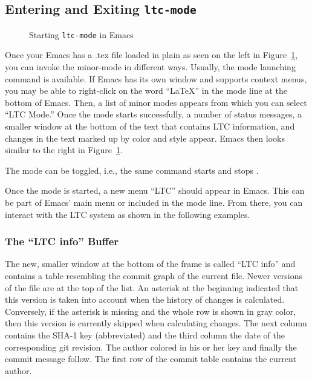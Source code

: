 \subsection{Entering and Exiting \texttt{ltc-mode}}

\begin{figure}[t]
\centering
{}
\hspace{2ex}
\hspace{2ex}
\caption{Starting \texttt{ltc-mode} in Emacs} \label{fig:emacs-ltc-started}
\end{figure}

Once your Emacs has a .tex file loaded in plain  as seen on the left in Figure~\ref{fig:emacs-ltc-started}, you can invoke the minor-mode  in different ways.  Usually, the mode launching command  is available.  If Emacs has its own window and supports context menus, you may be able to right-click on the word ``LaTeX'' in the mode line at the bottom of Emacs. Then, a list of minor modes appears from which you can select ``LTC Mode.''  Once the mode starts successfully, a number of status messages, a smaller window at the bottom of the text that contains LTC information, and changes in the text marked up by color and style appear.  Emacs then looks similar to the right in Figure~\ref{fig:emacs-ltc-started}.

The mode can be toggled, i.e., the same command starts and stops .

Once the mode is started, a new menu ``LTC'' should appear in Emacs.  This can be part of Emacs' main menu or included in the mode line.  From there, you can interact with the LTC system as shown in the following examples.

\subsubsection{The ``LTC info'' Buffer}

The new, smaller window at the bottom of the frame is called ``LTC info'' and contains a table resembling the commit graph of the current file.  Newer versions of the file are at the top of the list.  An asterisk at the beginning  indicated that this version is taken into account when the history of changes is calculated.  Conversely, if the asterisk is missing and the whole row is shown in gray color, then this version is currently skipped when calculating changes.  The next column contains the SHA-1 key (abbreviated) and the third column the date  of the corresponding git revision.  The author colored in his or her key and finally the commit message follow.  The first row of the commit table contains the current author.

